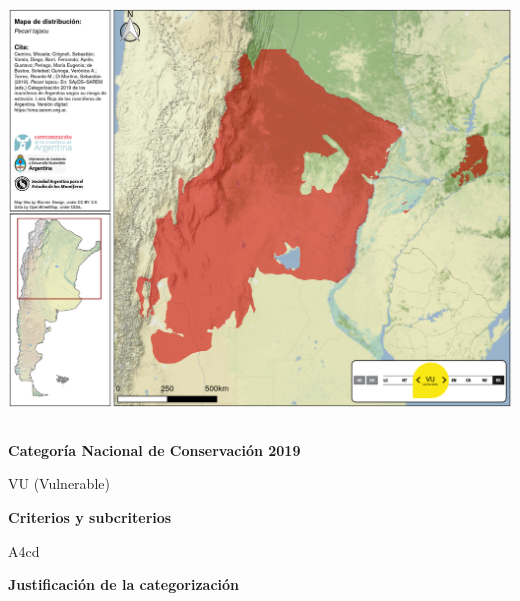 \documentclass[
  x11names]{article}
\begin{document}
\includegraphics[width=1\linewidth]{maps/Cetartiodactyla/Pecari_tajacu}

%
\begin{table}[H]
\centering
\begin{tabular}[t]{>{\raggedright\arraybackslash}m{16cm}>{}m{16cm}}
\toprule
\cellcolor{ceil}{\textcolor{white}{\textbf{\rule{0pt}{14pt}CATEGORÍAS DE CONSERVACIÓN}}}\\
\bottomrule
\end{tabular}
\end{table}

\vspace{-0.4cm}

\textbf{Categoría Nacional de Conservación 2019}

VU (Vulnerable)

\textbf{Criterios y subcriterios}

A4cd

\textbf{Justificación de la categorización}
\end{document}
